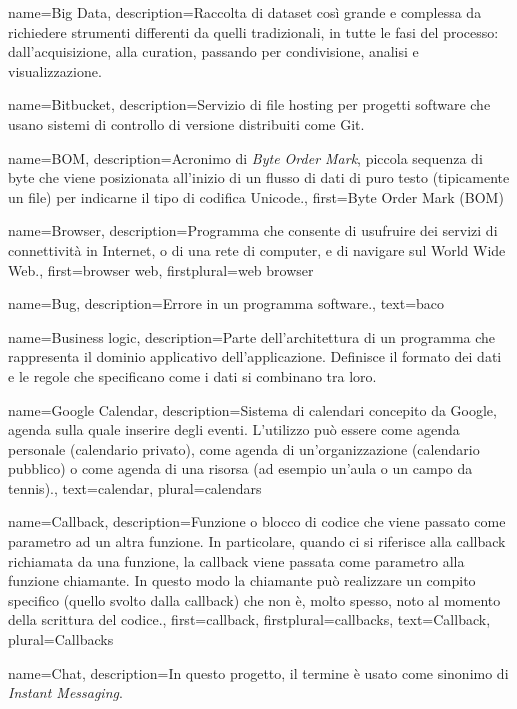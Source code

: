 {
name={Big Data},
description={Raccolta di dataset così grande e complessa da richiedere strumenti differenti da quelli tradizionali, in tutte le fasi del processo: dall'acquisizione, alla curation, passando per condivisione, analisi e visualizzazione.}
}

{
name={Bitbucket},
description={Servizio di file hosting per progetti software che usano sistemi di controllo di versione distribuiti come Git.}
}

{
name={BOM},
description={Acronimo di \textit{Byte Order Mark}, piccola sequenza di byte che viene posizionata all'inizio di un flusso di dati di puro testo (tipicamente un file) per indicarne il tipo di codifica Unicode.},
first={Byte Order Mark (BOM)}
}

{
name={Browser},
description={Programma che consente di usufruire dei servizi di connettività in Internet, o di una rete di computer, e di navigare sul World Wide Web.},
first={browser web},
firstplural={web browser}
}

{
name={Bug},
description={Errore in un programma software.},
text={baco}
}

{
name={Business logic},
description={Parte dell'architettura di un programma che rappresenta il dominio applicativo dell'applicazione. Definisce il formato dei dati e le regole che specificano come i dati si combinano tra loro.}
}

{
name={Google Calendar},
description={Sistema di calendari concepito da Google, agenda sulla quale inserire degli eventi. L'utilizzo può essere come agenda personale (calendario privato), come agenda di un'organizzazione (calendario pubblico) o come agenda di una risorsa (ad esempio un'aula o un campo da tennis).},
text={calendar},
plural={calendars}
}

{
name={Callback},
description={Funzione o blocco di codice che viene passato come parametro ad un altra funzione.
In particolare, quando ci si riferisce alla callback richiamata da una funzione, la callback viene passata come parametro alla funzione chiamante. In questo modo la chiamante può realizzare un compito specifico (quello svolto dalla callback) che non è, molto spesso, noto al momento della scrittura del codice.},
first={callback},
firstplural={callbacks},
text={Callback},
plural={Callbacks}
}

{
name={Chat},
description={In questo progetto, il termine è usato come sinonimo di \textit{Instant Messaging}.}
}

